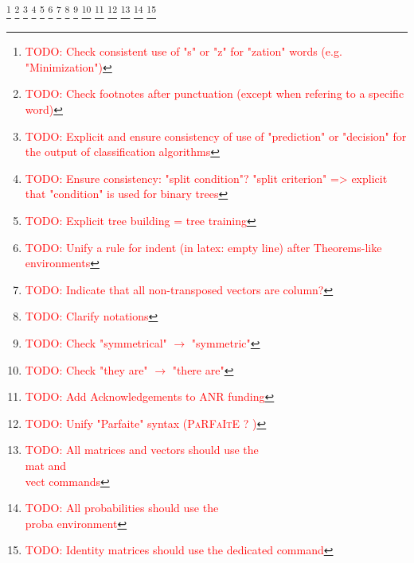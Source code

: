 \documentclass[a4paper]{book}
\newcommand{\todo}[1]{%
\textcolor{red}{\footnote{\textcolor{red}{TODO: #1}}}}
\newcommand{\vect}[1]{\boldsymbol{#1}}
\newcommand{\mat}[1]{\boldsymbol{#1}}
\newcommand{\proba}[1]{\mathbb{P}\left(#1\right)}
\begin{document}



\printbibliography

\todo{Check consistent use of "s" or "z" for "zation" words (e.g. "Minimization")}
\todo{Check footnotes after punctuation (except when refering to a specific word)}
\todo{Explicit and ensure consistency of use of "prediction" or "decision" for the output of classification algorithms}
\todo{Ensure consistency: "split condition"? "split criterion" => explicit that "condition" is used for binary trees}
\todo{Explicit tree building = tree training}
\todo{Unify a rule for indent (in latex: empty line) after Theorems-like environments}
\todo{Indicate that all non-transposed vectors are column?}
\todo{Clarify notations}
\todo{Check "symmetrical" $\rightarrow$ "symmetric"}
\todo{Check "they are" $\rightarrow$ "there are"}
\todo{Add Acknowledgements to ANR funding}
\todo{Unify "Parfaite" syntax (\textsc{PaRFaItE} ? )}
\todo{All matrices and vectors should use the \\mat and \\vect commands}
\todo{All probabilities should use the \\proba environment}
\todo{Identity matrices should use the dedicated command}
\end{document}
